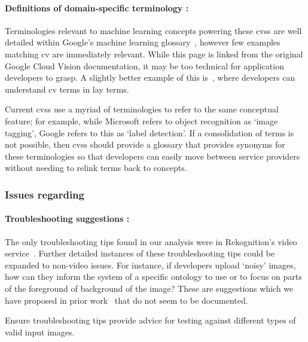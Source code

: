 \paragraph{Definitions of domain-specific terminology :}  Terminologies relevant to machine learning concepts powering these \glspl{cvs} are well detailed within Google's machine learning glossary~, however few examples matching \gls{cv} are immediately relevant. While this page is linked from the original Google Cloud Vision documentation, it may be too technical for application developers to grasp. A slightly better example of this is~, where developers can understand \gls{cv} terms in lay terms.

\begin{leftbar}\SuggestedImprovement
Current \glspl{cvs} use a myriad of terminologies to refer to the same conceptual feature; for example, while Microsoft refers to object recognition as `image tagging', Google refers to this as `label detection'. If a consolidation of terms is not possible, then \glspl{cvs} should provide a glossary that provides synonyms for these terminologies so that developers can easily move between service providers without needing to relink terms back to concepts.
\end{leftbar}

\subsubsection[Dimension D Issues]{Issues regarding \dimd{}}

\paragraph{Troubleshooting suggestions :} The only troubleshooting tips found in our analysis were in Rekognition's video service~. Further detailed instances of these troubleshooting tips could be expanded to non-video issues. For instance, if developers upload `noisy' images, how can they inform the system of a specific ontology to use or to focus on parts of the foreground of background of the image? These are suggestions which we have proposed in prior work~\citep{Cummaudo:2019icsme} that do not seem to be documented.

\begin{leftbar}\SuggestedImprovement
Ensure troubleshooting tips provide advice for testing against different types of valid input images.   
\end{leftbar}

